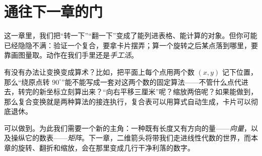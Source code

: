 \section*{通往下一章的门}

这一章里，我们把“转一下”“翻一下”变成了能列进表格、能计算的对象。但你可能已经隐隐不满：验证一个复合，要拿卡片摆弄；算一个旋转之后某点落到哪里，要靠画图量取。动作在我们手里还是\emph{手工活}。

有没有办法让变换变成算术？比如，把平面上每个点用两个数 $(x,y)$ 记下位置，那么“绕原点转 $90^\circ$”能不能写成一套对这两个数的固定算法——不管什么点代进去，转完的新坐标立刻算出来？“向右平移三厘米”呢？缩放两倍呢？如果能做到，那么复合变换就是两种算法的接连执行，复合表可以用算式自动生成，卡片可以彻底退休。

可以做到。为此我们需要一个新的主角：一种既有长度又有方向的量——\emph{向量}，以及操纵它的数表——\emph{矩阵}。下一章，二维箭头将带我们走进线性代数的世界，而本章的旋转、翻折和缩放，会在那里变成几行干净利落的数字。
